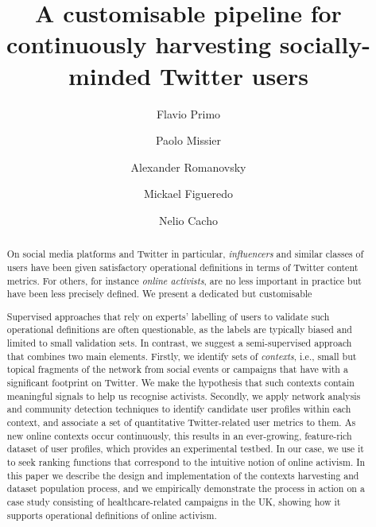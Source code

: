 \documentclass[runningheads]{llncs}
\begin{document}
%
\title{A customisable pipeline for continuously harvesting socially-minded Twitter users}
%
%
\author{Flavio Primo \and
Paolo Missier \and
Alexander Romanovsky \and
Mickael Figueredo \and
Nelio Cacho}

%
%
%
\maketitle       %
%


\begin{abstract}
	On social media platforms and Twitter in particular, \textit{influencers} and similar classes of users have been given satisfactory operational definitions in terms of Twitter content metrics.
	For others, for instance \textit{online activists}, are no less important in practice but have been less precisely defined.
	We present a dedicated but customisable 
	
	Supervised approaches that rely on experts' labelling of users to validate such operational definitions are often questionable, as the labels are typically biased and limited to small validation sets.
	In contrast, we suggest a semi-supervised approach that combines two main elements. 
	Firstly, we identify sets of \textit{contexts}, i.e., small but topical fragments of the network from social events or campaigns that have with a significant footprint on Twitter.
	We make the hypothesis that such contexts contain meaningful signals to help us recognise activists. 
	Secondly, we apply network analysis and community detection techniques to identify candidate user profiles within each context, and associate a set of quantitative Twitter-related user metrics to them.
	As new online contexts occur continuously, this results in an ever-growing, feature-rich dataset of user profiles, which provides an experimental testbed. In our case, we use it to seek ranking functions that correspond to the intuitive notion of online activism.
	In this paper we describe the design and implementation of the contexts harvesting and dataset population process, and we empirically demonstrate the process in action on a case study consisting of healthcare-related campaigns in the UK, showing how it supports operational definitions of online activism.
	
\end{abstract}
%
\end{document}
